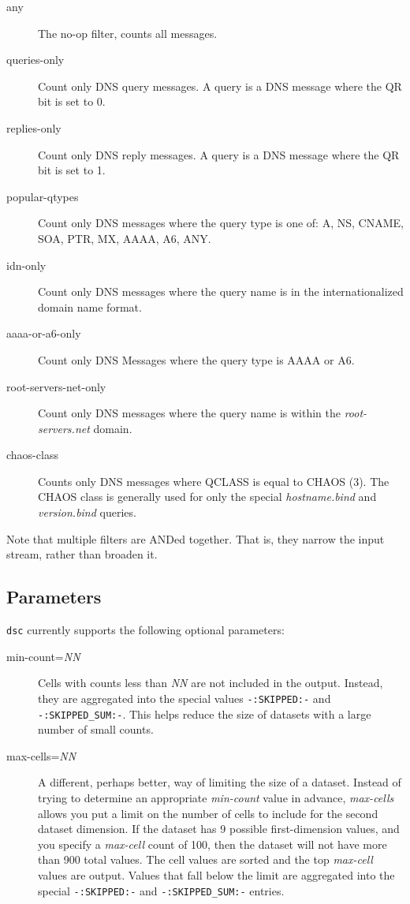 \documentclass{report}
\begin{document}
\begin{description}
\item[any]
	The no-op filter, counts all messages.
\item[queries-only]
	Count only DNS query messages.  A query is a DNS message
	where the QR bit is set to 0.
\item[replies-only]
	Count only DNS reply messages.  A query is a DNS message 
        where the QR bit is set to 1.
\item[popular-qtypes]
	Count only DNS messages where the query type is one of:
	A, NS, CNAME, SOA, PTR, MX, AAAA, A6, ANY.
\item[idn-only]
	Count only DNS messages where the query name is in the
	internationalized domain name format.
\item[aaaa-or-a6-only]
	Count only DNS Messages where the query type is AAAA or A6.
\item[root-servers-net-only]
	Count only DNS messages where the query name is within
	the {\em root-servers.net\/} domain.
\item[chaos-class]
	Counts only DNS messages where QCLASS is equal to
	CHAOS (3).  The CHAOS class is generally used
	for only the special {\em hostname.bind\/} and
	{\em version.bind\/} queries.
\end{description}

\noindent
Note that multiple filters are ANDed together.  That is, they
narrow the input stream, rather than broaden it.

\subsection{Parameters}

\noindent
{\tt dsc\/} currently supports the following optional parameters:

\begin{description}
\item[min-count={\em NN\/}]
	Cells with counts less than {\em NN\/} are not included in
	the output.  Instead, they are aggregated into the special
	values {\tt -:SKIPPED:-\/} and {\tt -:SKIPPED\_SUM:-\/}.
	This helps reduce the size of datasets with a large number
	of small counts.
\item[max-cells={\em NN\/}]
	A different, perhaps better, way of limiting the size
	of a dataset.  Instead of trying to determine an appropriate
	{\em min-count\/} value in advance, {\em max-cells\/}
	allows you put a limit on the number of cells to
	include for the second dataset dimension.  If the dataset
	has 9 possible first-dimension values, and you specify
	a {\em max-cell\/} count of 100, then the dataset will not
	have more than 900 total values.  The cell values are sorted
	and the top {\em max-cell\/} values are output.  Values
	that fall below the limit are aggregated into the special
	{\tt -:SKIPPED:-\/} and {\tt -:SKIPPED\_SUM:-\/} entries.
\end{description}
\end{document}
